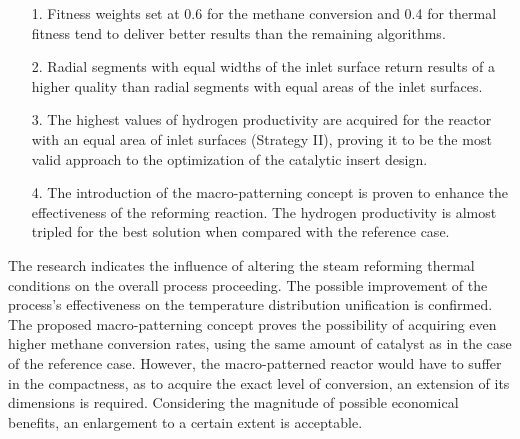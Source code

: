 \documentclass[preprint,12pt]{elsarticle}
\begin{document}
\begin{itemize}
\item [1.] Fitness weights set at 0.6 for the methane conversion and 0.4 for thermal fitness tend to deliver better results than the remaining algorithms.  
\item[2.] Radial segments with equal widths of the inlet surface return results of a higher quality than radial segments with equal areas of the inlet surfaces.
\item[3.] The highest values of hydrogen productivity are acquired for the reactor with an equal area of inlet surfaces (Strategy II),  proving it to be the most valid approach to the optimization of the catalytic insert design.
\item[4.] The introduction of the macro-patterning concept is proven to enhance the effectiveness of the reforming reaction. The hydrogen productivity is almost tripled for the best solution when compared with the reference case.
\end{itemize}

The research indicates the influence of altering the steam reforming thermal conditions on the overall process proceeding. The possible improvement of the process's effectiveness on the temperature distribution unification is confirmed. The proposed macro-patterning concept proves the possibility of acquiring even higher methane conversion rates, using the same amount of catalyst as in the case of the reference case. However, the macro-patterned reactor would have to suffer in the compactness, as to acquire the exact level of conversion, an extension of its dimensions is required. Considering the magnitude of possible economical benefits, an enlargement to a certain extent is acceptable. 

\clearpage

 





\end{document}
